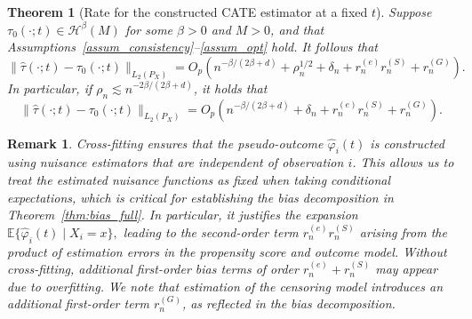 \documentclass{article}
\newtheorem{theorem}{Theorem}
\newtheorem{remark}{Remark}
\begin{document}
  

\begin{theorem}[Rate for the constructed CATE estimator at a fixed $t$]\label{thm:overall_rate_holder}
Suppose 
    \(
\tau_0(\cdot;t)\in\mathcal H^\beta(M)
    \)
    for some $\beta>0$ and $M>0$, and that 
 Assumptions~\ref{assum_consistency}--\ref{assum_opt} hold.  
It follows that 
\[
\|\hat\tau(\cdot;t)-\tau_0(\cdot;t)\|_{L_2(P_X)}
=
O_p\!\left(
n^{-\beta/(2\beta+d)}
+
\rho_n^{1/2}
+
\delta_n
+
r_n^{(e)}r_n^{(S)}
+
r_n^{(G)}
\right).
\]
In particular, if $\rho_n\lesssim n^{-2\beta/(2\beta+d)}$,  it holds that
\[
\|\hat\tau(\cdot;t)-\tau_0(\cdot;t)\|_{L_2(P_X)}
=
O_p\!\left(
n^{-\beta/(2\beta+d)}
+
\delta_n
+
r_n^{(e)}r_n^{(S)}
+
r_n^{(G)}
\right).
\]
\end{theorem}


\begin{remark} Cross-fitting ensures that the pseudo-outcome $\hat{\varphi}_i(t)$ is constructed using nuisance estimators that are independent of observation $i$. This allows us to treat the estimated nuisance functions as fixed when taking conditional expectations, which is critical for establishing the bias decomposition in Theorem~\ref{thm:bias_full}.
In particular, it justifies the expansion
\(
\mathbb{E}\{\hat{\varphi}_i(t)\mid X_i=x\},
\)
leading to the second-order term $r_n^{(e)} r_n^{(S)}$ arising from the product of estimation errors in the propensity score and outcome model. Without cross-fitting, additional first-order bias terms of order $r_n^{(e)} + r_n^{(S)}$ may appear due to overfitting.
We note that estimation of the censoring model introduces an additional first-order term $r_n^{(G)}$, as reflected in the bias decomposition.
\end{remark}
\end{document}
